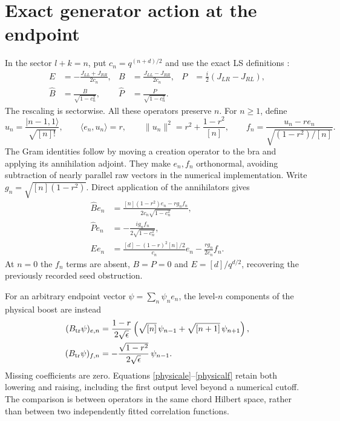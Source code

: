 \documentclass[11pt]{article}
\newcommand{\eps}{\epsilon}
\newcommand{\ket}[1]{|#1\rangle}
\newcommand{\B}{\widehat B}
\newcommand{\PP}{\widehat P}
\newcommand{\Bt}{B_{\rm tr}}
\begin{document}
\newpage
\section{Exact generator action at the endpoint}
In the sector $l+k=n$, put $c_n=q^{(n+d)/2}$ and use
the exact LS definitions \cite[(48), (147)]{LS}:
\begin{align}
 E&=-\frac{J_{LL}+J_{RR}}{2c_n},&
 B&=\frac{J_{LL}-J_{RR}}{2c_n},&
 P&=\frac{i}{2}(J_{LR}-J_{RL}),\\
 \B&=\frac{B}{\sqrt{1-c_n^2}},&
 \PP&=\frac{P}{\sqrt{1-c_n^2}}.&&
\end{align}
The rescaling is sectorwise. All these operators preserve $n$.
For $n\ge1$, define
\[
 u_n=\frac{\ket{n-1,1}}{\sqrt{[n]!}},\qquad
 \langle e_n,u_n\rangle=r,\qquad
 \|u_n\|^2=r^2+\frac{1-r^2}{[n]},\qquad
 f_n=\frac{u_n-re_n}{\sqrt{(1-r^2)/[n]}}.
\]
The Gram identities follow by moving a creation operator to
the bra and applying its annihilation adjoint. They make $e_n,f_n$
orthonormal, avoiding subtraction of nearly parallel raw vectors
in the numerical implementation. Write $g_n=\sqrt{[n](1-r^2)}$.
Direct application of the annihilators gives
\begin{align}
 \B e_n&=\frac{[n](1-r^2)e_n-rg_n f_n}
                 {2c_n\sqrt{1-c_n^2}},\label{Bexact}\\
 \PP e_n&=-\frac{ig_n f_n}{2\sqrt{1-c_n^2}},\label{Pexact}\\
 E e_n&=\frac{[d]-(1-r)^2[n]/2}{c_n}e_n
                 -\frac{rg_n}{2c_n}f_n.\label{Eexact}
\end{align}
At $n=0$ the $f_n$ terms are absent, $B=P=0$ and
$E=[d]/q^{d/2}$, recovering the previously recorded seed obstruction.

For an arbitrary endpoint vector $\psi=\sum_n\psi_ne_n$,
the level-$n$ components of the physical boost are instead
\begin{align}
 (\Bt\psi)_{e,n}
 &=\frac{1-r}{2\sqrt\eps}
       \left(\sqrt{[n]}\,\psi_{n-1}
                    +\sqrt{[n+1]}\,\psi_{n+1}\right),\label{physicale}\\
 (\Bt\psi)_{f,n}
 &=-\frac{\sqrt{1-r^2}}{2\sqrt\eps}\,\psi_{n-1}.\label{physicalf}
\end{align}
Missing coefficients are zero. Equations \eqref{physicale}--\eqref{physicalf}
retain both lowering and raising, including the first output
level beyond a numerical cutoff. The comparison is between
operators in the same chord Hilbert space, rather than between
two independently fitted correlation functions.
\end{document}
